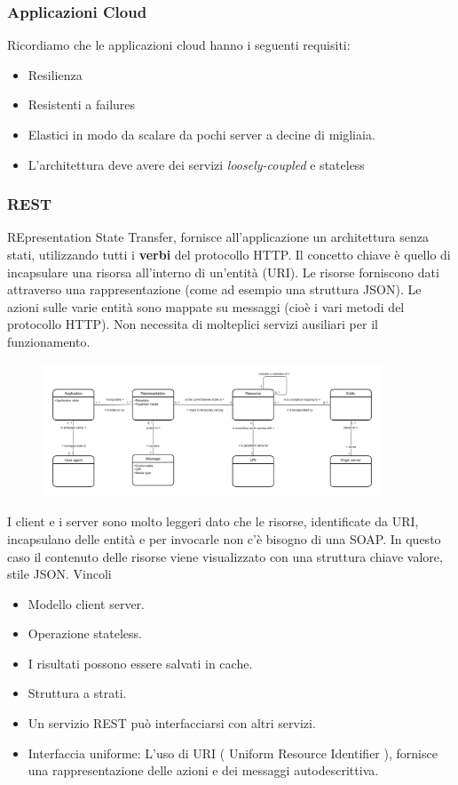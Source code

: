\documentclass{article}
\begin{document}
		\subsubsection{Applicazioni Cloud}
		Ricordiamo che le applicazioni cloud hanno i seguenti requisiti:
		\begin{itemize}
		    \item Resilienza
		    \item Resistenti a failures
		    \item Elastici in modo da scalare da pochi server a decine di migliaia.
		    \item L'architettura deve avere dei servizi \textit{loosely-coupled} e stateless
		\end{itemize}
		
		\subsubsection{REST}
		REpresentation State Transfer, fornisce all'applicazione un architettura senza stati, utilizzando tutti i \textbf{verbi} del protocollo HTTP.
		Il concetto chiave è quello di incapsulare una risorsa all'interno di un'entità (URI). Le risorse forniscono dati attraverso una rappresentazione (come ad esempio una struttura JSON). Le azioni sulle varie entità sono mappate su messaggi (cioè i vari metodi del protocollo HTTP). Non necessita di molteplici servizi ausiliari per il funzionamento.
		
		\begin{figure}[ht]
		\centering
		\includegraphics[width=0.9\textwidth]{SAC_08.png}
		\end{figure}

		I client e i server sono molto leggeri dato che le risorse, identificate da URI, incapsulano delle entità e per invocarle non c'è bisogno di una SOAP. In questo caso il contenuto delle risorse viene visualizzato con una struttura chiave valore, stile JSON.
		Vincoli
		
		\begin{itemize}
		    \item Modello client server.
		    \item Operazione stateless.
		    \item I risultati possono essere salvati in cache.
		    \item Struttura a strati. 
		    \item Un servizio REST può interfacciarsi con altri servizi. 
		    \item Interfaccia uniforme: L'uso di URI ( Uniform Resource Identifier ), fornisce una rappresentazione delle azioni e dei messaggi autodescrittiva. 
		\end{itemize}
		
\end{document}
